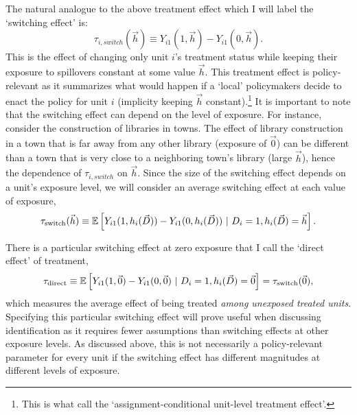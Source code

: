 \documentclass[11pt]{article}
\begin{document}
The natural analogue to the above treatment effect which I will label the `switching effect' is:
\[
    \tau_{i, switch}(\vec{h}) \equiv Y_{i1}(1, \vec{h}) - Y_{i1}(0, \vec{h}).
\] 
This is the effect of changing only unit $i$'s treatment status while keeping their exposure to spillovers constant at some value $\vec{h}$. This treatment effect is policy-relevant as it summarizes what would happen if a `local' policymakers decide to enact the policy for unit $i$ (implicity keeping $\vec{h}$ constant).\footnote{This is what \citet{Savje_Aronow_Hudgens_2021} call the `assignment-conditional unit-level treatment effect'.} It is important to note that the switching effect can depend on the level of exposure. For instance, consider the construction of libraries in towns. The effect of library construction in a town that is far away from any other library (exposure of $\vec{0}$) can be different than a town that is very close to a neighboring town's library (large $\vec{h}$), hence the dependence of $\tau_{i, switch}$ on $\vec{h}$. Since the size of the switching effect depends on a unit's exposure level, we will consider an average switching effect at each value of exposure, 
\[
    \tau_{\text{switch}}(\vec{h}) \equiv \mathbb{E}\left[Y_{i1}(1, h_i(\vec{D})) - Y_{i1}(0, h_i(\vec{D})) \ \vert \ D_i = 1, h_i(\vec{D}) = \vec{h}\right].
\]


There is a particular switching effect at zero exposure that I call the `direct effect' of treatment, 
\[
    \tau_{\text{direct}} \equiv \mathbb{E}\left[Y_{i1}(1, \vec{0}) - Y_{i1}(0, \vec{0}) \ \vert \ D_i = 1, h_i(\vec{D}) = \vec{0}\right] = \tau_{\text{switch}}(\vec{0}),
\] 
which measures the average effect of being treated \emph{among unexposed treated units}. Specifying this particular switching effect will prove useful when discussing identification as it requires fewer assumptions than switching effects at other exposure levels. As discussed above, this is not necessarily a policy-relevant parameter for every unit if the switching effect has different magnitudes at different levels of exposure. 
\end{document}
